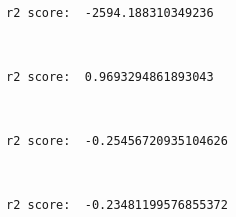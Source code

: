\documentclass[11pt]{article}
\begin{document}
    
    \begin{center}
    \end{center}
    { \hspace*{\fill} \\}
    
    \begin{Verbatim}[commandchars=\\\{\}]
r2 score:  -2594.188310349236

    \end{Verbatim}

    \begin{center}
    \end{center}
    { \hspace*{\fill} \\}
    
    \begin{Verbatim}[commandchars=\\\{\}]
r2 score:  0.9693294861893043

    \end{Verbatim}

    \begin{center}
    \end{center}
    { \hspace*{\fill} \\}
    
    \begin{Verbatim}[commandchars=\\\{\}]
r2 score:  -0.25456720935104626

    \end{Verbatim}

    \begin{center}
    \end{center}
    { \hspace*{\fill} \\}
    
    \begin{Verbatim}[commandchars=\\\{\}]
r2 score:  -0.23481199576855372

    \end{Verbatim}
\end{document}
